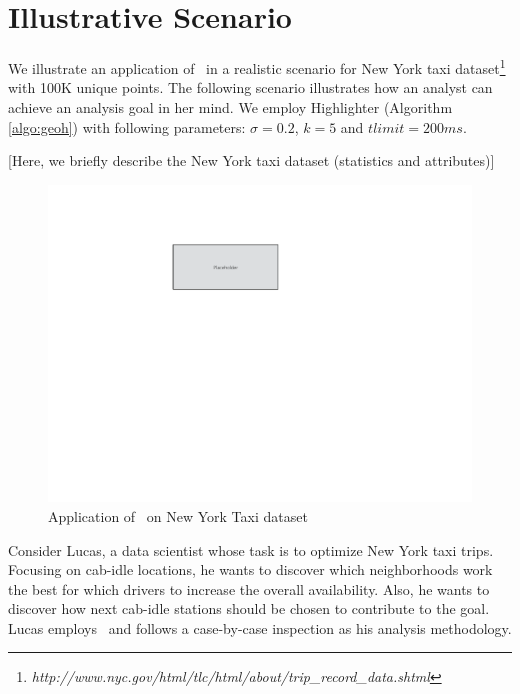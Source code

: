 \section{Illustrative Scenario}\label{sec:scenarios}
We illustrate an application of \framework\ in a realistic scenario for New York taxi dataset\footnote{\it http://www.nyc.gov/html/tlc/html/about/trip_record_data.shtml} with 100K unique points. The following scenario illustrates how an analyst can achieve an analysis goal in her mind. We employ {\sc Highlighter} (Algorithm \ref{algo:geoh}) with following parameters: $\sigma = 0.2$, $k = 5$ and $tlimit = 200ms$. 

\vspace{5pt}
 [Here, we briefly describe the New York taxi dataset (statistics and attributes)]

\begin{figure}
  \centering
  \includegraphics[width=\columnwidth]{figs/placeholder}
\caption{Application of \framework\ on New York Taxi dataset}
\label{fig:app}
\end{figure}

\vspace{5pt}
Consider Lucas, a data scientist whose task is to optimize New York taxi trips. Focusing on cab-idle locations, he wants to discover which neighborhoods work the best for which drivers to increase the overall availability. Also, he wants to discover how next cab-idle stations should be chosen to contribute to the goal. Lucas employs \framework\ and follows a case-by-case inspection as his analysis methodology.

